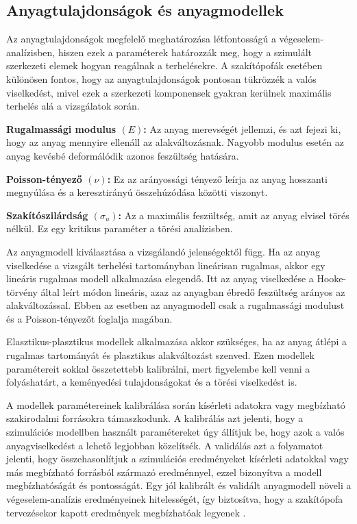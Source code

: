\documentclass[12pt,a4paper,oneside]{report}
\begin{document}
\subsection{Anyagtulajdonságok és anyagmodellek}
Az anyagtulajdonságok megfelelő meghatározása létfontosságú a végeselem-analízisben, hiszen ezek a paraméterek határozzák meg, hogy a szimulált szerkezeti elemek hogyan reagálnak a terhelésekre. A szakítópofák esetében különösen fontos, hogy az anyagtulajdonságok pontosan tükrözzék a valós viselkedést, mivel ezek a szerkezeti komponensek gyakran kerülnek maximális terhelés alá a vizsgálatok során.

\textbf{Rugalmassági modulus $(E)$:} Az anyag merevségét jellemzi, és azt fejezi ki, hogy az anyag mennyire ellenáll az alakváltozásnak. Nagyobb modulus esetén az anyag kevésbé deformálódik azonos feszültség hatására.

\textbf{Poisson-tényező $(\nu)$:} Ez az arányossági tényező leírja az anyag hosszanti megnyúlása és a keresztirányú összehúzódása közötti viszonyt.

\textbf{Szakítószilárdság $(\sigma_u)$:} Az a maximális feszültség, amit az anyag elvisel törés nélkül. Ez egy kritikus paraméter a törési analízisben.

Az anyagmodell kiválasztása a vizsgálandó jelenségektől függ. Ha az anyag viselkedése a vizsgált terhelési tartományban lineárisan rugalmas, akkor egy lineáris rugalmas modell alkalmazása elegendő. Itt az anyag viselkedése a Hooke-törvény által leírt módon lineáris, azaz az anyagban ébredő feszültség arányos az alakváltozással. Ebben az esetben az anyagmodell csak a rugalmassági modulust és a Poisson-tényezőt foglalja magában.

Elasztikus-plasztikus modellek alkalmazása akkor szükséges, ha az anyag átlépi a rugalmas tartományát és plasztikus alakváltozást szenved. Ezen modellek paramétereit sokkal összetettebb kalibrálni, mert figyelembe kell venni a folyáshatárt, a keményedési tulajdonságokat és a törési viselkedést is.

A modellek paramétereinek kalibrálása során kísérleti adatokra vagy megbízható szakirodalmi forrásokra támaszkodunk. A kalibrálás azt jelenti, hogy a szimulációs modellben használt paramétereket úgy állítjuk be, hogy azok a valós anyagviselkedést a lehető legjobban közelítsék. A validálás azt a folyamatot jelenti, hogy összehasonlítjuk a szimulációs eredményeket kísérleti adatokkal vagy más megbízható forrásból származó eredménnyel, ezzel bizonyítva a modell megbízhatóságát és pontosságát. Egy jól kalibrált és validált anyagmodell növeli a végeselem-analízis eredményeinek hitelességét, így biztosítva, hogy a szakítópofa tervezésekor kapott eredmények megbízhatóak legyenek \cite{tamas2014vegeselem}.
\end{document}
